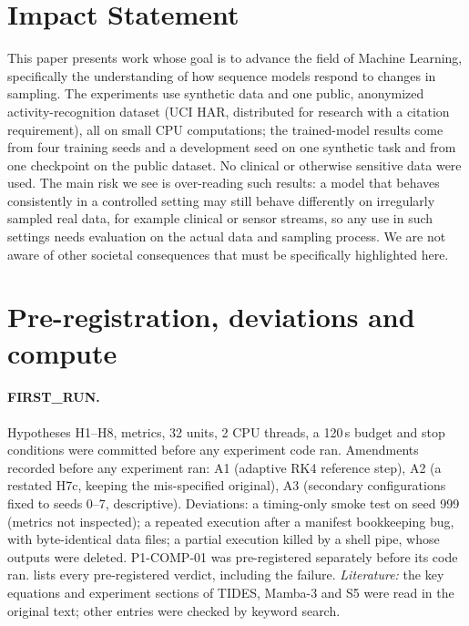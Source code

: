 \documentclass{article}
\theoremstyle{plain}
\theoremstyle{definition}
\theoremstyle{remark}
\begin{document}
\section*{Impact Statement}

This paper presents work whose goal is to advance the field of Machine Learning, specifically the understanding of how sequence models respond to changes in sampling.
The experiments use synthetic data and one public, anonymized activity-recognition dataset (UCI HAR, distributed for research with a citation requirement), all on small CPU computations; the trained-model results come from four training seeds and a development seed on one synthetic task and from one checkpoint on the public dataset. No clinical or otherwise sensitive data were used.
The main risk we see is over-reading such results: a model that behaves consistently in a controlled setting may still behave differently on irregularly sampled real data, for example clinical or sensor streams, so any use in such settings needs evaluation on the actual data and sampling process.
We are not aware of other societal consequences that must be specifically highlighted here.




\newpage
\appendix
\onecolumn

\FloatBarrier
\section{Pre-registration, deviations and compute}
\label{app:prereg}

\paragraph{FIRST\_RUN.}
Hypotheses H1--H8, metrics, 32 units, 2 CPU threads, a 120\,s budget and stop conditions were committed before any experiment code ran.
Amendments recorded before any experiment ran: A1 (adaptive RK4 reference step), A2 (a restated H7c, keeping the mis-specified original), A3 (secondary configurations fixed to seeds 0--7, descriptive).
Deviations: a timing-only smoke test on seed 999 (metrics not inspected); a repeated execution after a manifest bookkeeping bug, with byte-identical data files; a partial execution killed by a shell pipe, whose outputs were deleted.
P1-COMP-01 was pre-registered separately before its code ran.
 lists every pre-registered verdict, including the failure.
\emph{Literature:} the key equations and experiment sections of TIDES, Mamba-3 and S5 were read in the original text; other entries were checked by keyword search.
\end{document}
